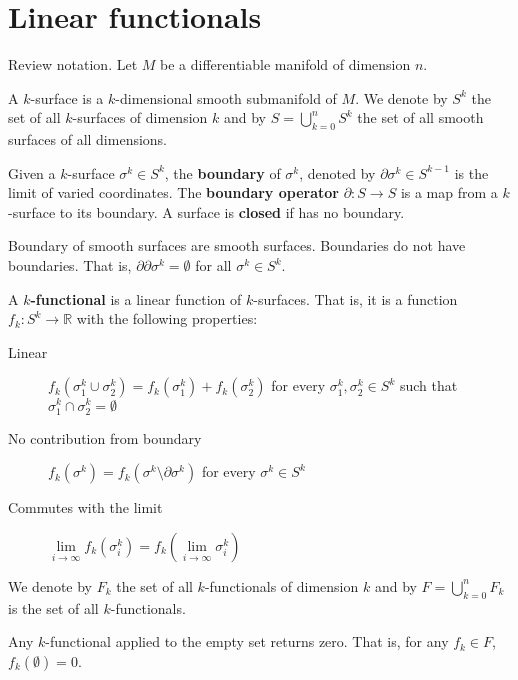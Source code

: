 \section{Linear functionals}

Review notation. Let $M$ be a differentiable manifold of dimension $n$.

\begin{defn}
	A $k$-surface is a $k$-dimensional smooth submanifold of $M$. We denote by $S^k$ the set of all  $k$-surfaces of dimension $k$ and by $S = \bigcup_{k=0}^n S^k$ the set of all smooth surfaces of all dimensions.
\end{defn}

\begin{defn}
	Given a $k$-surface $\sigma^k \in S^k$, the \textbf{boundary} of $\sigma^k$, denoted by $\partial\sigma^k \in S^{k-1}$ is the limit of varied coordinates. The \textbf{boundary operator} $\partial : S \to S$ is a map from a $k$-surface to its boundary. A surface is \textbf{closed} if has no boundary.
\end{defn}

\begin{coro}
	Boundary of smooth surfaces are smooth surfaces. Boundaries do not have boundaries. That is, $\partial\partial \sigma^k = \emptyset$ for all $\sigma^k \in S^k$.
\end{coro}


\begin{defn}
	A \textbf{$k$-functional} is a linear function of $k$-surfaces. That is, it is a function $f_k : S^k \to \mathbb{R}$ with the following properties:
	\begin{description}
		\item[Linear] $f_k(\sigma^k_1 \cup \sigma^k_2) = f_k(\sigma^k_1) + f_k(\sigma^k_2)$ for every $\sigma^k_1, \sigma^k_2 \in S^k$ such that $\sigma^k_1 \cap \sigma^k_2 = \emptyset$
		\item[No contribution from boundary] $f_k(\sigma^k) = f_k(\sigma^k \setminus \partial \sigma^k)$ for every $\sigma^k \in S^k$
		\item[Commutes with the limit] $\lim\limits_{i \to \infty} f_k(\sigma_i^k) = f_k(\lim\limits_{i \to \infty}\sigma_i^k)$
	\end{description}
	We denote by $F_k$ the set of all $k$-functionals of dimension $k$ and by $F = \bigcup_{k=0}^nF_k$ is the set of all $k$-functionals.
\end{defn}

\begin{coro}
	Any $k$-functional applied to the empty set returns zero. That is, for any $f_k \in F$, $f_k(\emptyset) = 0$.
\end{coro}

